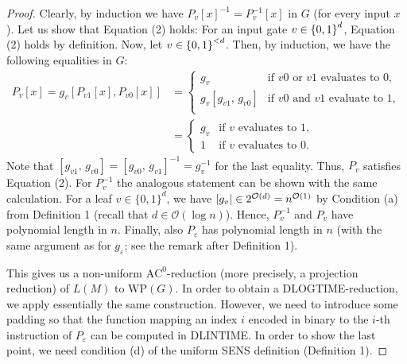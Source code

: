 \documentclass[10pt,a4paper]{article}
\newcommand{\oneset}[1]{\left\{\mathinner{#1}\right\}}
\newcommand{\abs}[1]{\left|\mathinner{#1}\right|}
\newcommand{\eps}{\varepsilon}
\begin{document}
\begin{proof}
  Clearly, by induction we have $ P_v[x]^{-1} = P_v^{-1}[x]$ in $G$ (for every input $x$). Let us
  show that Equation (2) holds: For an input gate
  $v \in \oneset{0,1}^{d}$, Equation (2) holds by definition. Now, let
  $v \in \oneset{0,1}^{< d}$. Then, by induction, we have the following equalities in $G$:
  \begin{align*}
    P_v[x] = g_v  [P_{v1}[x], P_{v0}[x]]
    &= 	\begin{cases}
      g_v  & \text{if } v0 \text{ or }  v1 \text{ evaluates to } 0, \\
      g_v [ g_{v1},\,  g_{v0} ] & \text{if } v0 \text{ and }  v1 \text{ evaluate to } 1, \\
    \end{cases}\\
    &= 	\begin{cases}
      g_v  & \text{if } v \text{ evaluates to } 1, \\
      1 & \text{if } v \text{ evaluates to } 0.		
    \end{cases}
  \end{align*}
  Note that $[ g_{v1},\,  g_{v0}] = [ g_{v0},\,  g_{v1}]^{-1} = g_v^{-1}$ for the last equality.
  Thus, $P_v$ satisfies Equation (2). For $P_v^{-1}$ the analogous
  statement can be shown with the same calculation. 
  For a leaf $v \in \{0,1\}^d$, we have $\abs{g_v} \in 2^{\mathcal{O}(d)} = n^{\mathcal{O}(1)}$
  by Condition (a) from Definition 1 (recall that $d \in \mathcal{O}(\log n)$).
  Hence, $P_v^{-1}$ and $P_v$ have polynomial
  length in $n$. Finally, also $P_\eps$ has polynomial length in $n$ (with the same
  argument as for $g_\eps$; see the remark after Definition 1).

This gives us a non-uniform $\mathrm{AC}^0$-reduction (more precisely, a projection reduction) of $L(M)$ to $\mathrm{WP}(G)$. In order to obtain a DLOGTIME-reduction, we apply essentially the same construction. However, we need to introduce some padding so that the function mapping an index $i$ encoded in binary to the $i$-th instruction of $P_\varepsilon$ can be computed in DLINTIME. In order to show the last point, we need condition (d) of the uniform SENS definition (Definition 1).
\end{proof}
\end{document}

